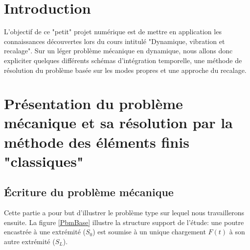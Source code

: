 \documentclass[fleqn]{article}
\begin{document}
\setlength{\fboxsep}{10pt}
\vspace*{-20mm}
\begin{center}
     \centering
\end{center}


\vspace{2cm}

\section*{Introduction}

\begin{center}
\begin{minipage}{14cm}
\hspace{1cm} L'objectif de ce "petit" projet numérique est de mettre en application les connaissances découvertes lors du cours intitulé "Dynamique, vibration et recalage". Sur  un léger problème mécanique en dynamique, nous allons donc expliciter quelques différents schémas d'intégration temporelle, une méthode de résolution du problème basée sur les modes propres et une approche du recalage.
 \end{minipage}
\end{center}
\section{Présentation du problème mécanique et sa résolution par la méthode des éléments finis "classiques"}

\subsection{\'Ecriture du problème mécanique}

Cette partie a pour but d'illustrer le problème type sur lequel nous travaillerons ensuite. La figure \ref{PbmBase} illustre la structure support de l'étude: une poutre encastrée à une extrémité ($S_0$) est soumise à un unique chargement $F(t)$ à son autre extrémité ($S_L$).
\end{document}
